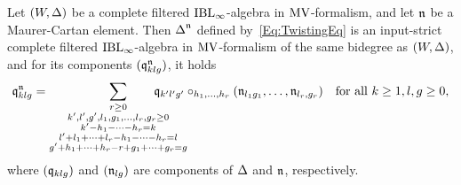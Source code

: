 \documentclass[\MainFolder/Text.tex]{subfiles}
\begin{document}
\begin{Proposition}\label{Eq:TwistingProp}
Let $(W,\operatorname{\Delta})$ be a complete filtered $\mathrm{IBL}_\infty$-algebra in $\mathrm{MV}$-formalism, and let $\mathfrak{n}$ be a Maurer-Cartan element. Then $\operatorname{\Delta}^{\mathfrak{n}}$ defined by~\eqref{Eq:TwistingEq} is an input-strict complete filtered $\mathrm{IBL}_\infty$-algebra in $\mathrm{MV}$-formalism of the same bidegree as $(W,\operatorname{\Delta})$, and for its components $(\mathfrak{q}_{klg}^{\mathfrak{n}})$, it holds
$$ \OPQ^\PMC_{klg} = \sum_{\substack{r\ge 0\\ k', l', g', l_1, g_1, \dotsc, l_{r}, g_{r} \ge 0 \\ k' - h_1 - \dotsb - h_{r}  = k \\ l' + l_1 + \dotsb + l_{r} - h_1 - \dotsb - h_r = l \\ g' + h_1 + \dotsb + h_{r} - r + g_1 + \dotsb+ g_{r} = g}}\hspace{-1cm}\OPQ_{k'l'g'}\circ_{h_1,\dotsc,h_{r}}(\PMC_{l_1 g_1},\dotsc,\PMC_{l_{r},g_{r}})\quad\text{for all }k\ge 1, l, g\ge 0, $$
where $(\mathfrak{q}_{klg})$ and $(\mathfrak{n}_{lg})$ are components of $\operatorname{\Delta}$ and $\mathfrak{n}$, respectively.
\end{Proposition}
\end{document}
